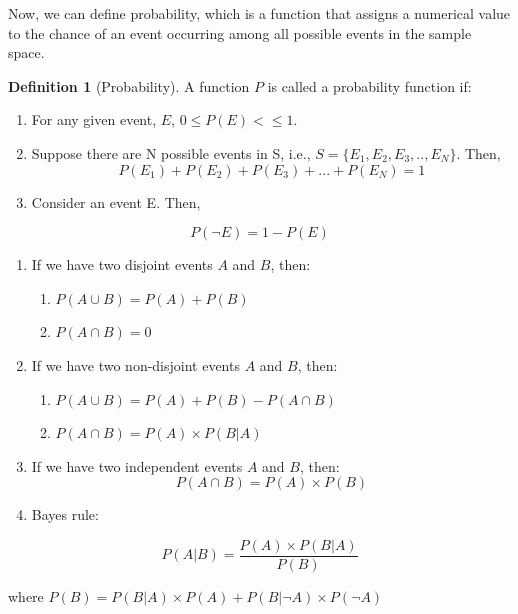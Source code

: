 \documentclass[
]{book}
\providecommand{\tightlist}{%
  \setlength{\itemsep}{0pt}\setlength{\parskip}{0pt}}
\theoremstyle{definition}
\newtheorem{definition}{Definition}[chapter]
\theoremstyle{definition}
\theoremstyle{definition}
\theoremstyle{definition}
\theoremstyle{remark}
\begin{document}
Now, we can define probability, which is a function that assigns a numerical value to the chance of an event occurring among all possible events in the sample space.

\begin{definition}[Probability]
\protect\hypertarget{def:unnamed-chunk-24}{}\label{def:unnamed-chunk-24}A function \(P\) is called a probability function if:

\begin{enumerate}
\def\labelenumi{\arabic{enumi}.}
\tightlist
\item
  For any given event, \(E\), \(0 \leq P(E)< \leq 1\).
\item
  Suppose there are N possible events in S, i.e., \(S=\{E_1, E_2, E_3,..,E_N\}\). Then,
  \[P(E_1)+P(E_2)+P(E_3)+...+P(E_N)=1\]
\item
  Consider an event E. Then,
\end{enumerate}

\[P(\lnot E) = 1 -P(E) \]

\begin{enumerate}
\def\labelenumi{\arabic{enumi}.}
\setcounter{enumi}{2}
\item
  If we have two disjoint events \(A\) and \(B\), then:

  \begin{enumerate}
  \def\labelenumii{\alph{enumii}.}
  \tightlist
  \item
    \(P(A \cup B)= P(A) + P(B)\)
  \item
    \(P(A \cap B)=0\)
  \end{enumerate}
\item
  If we have two non-disjoint events \(A\) and \(B\), then:

  \begin{enumerate}
  \def\labelenumii{\alph{enumii}.}
  \tightlist
  \item
    \(P(A \cup B)= P(A) + P(B)-P(A \cap B)\)
  \item
    \(P(A \cap B)= P(A) \times P(B|A)\)
  \end{enumerate}
\item
  If we have two independent events \(A\) and \(B\), then:
  \[P(A \cap B) = P(A) \times P(B)\]
\item
  Bayes rule:
\end{enumerate}

\[P(A|B)=\frac{P(A) \times P(B|A)}{P(B)}\]

where \(\displaystyle{P(B)= P(B|A)\times P(A) + P(B|\lnot A) \times P(\lnot A)}\)
\end{definition}
\end{document}
